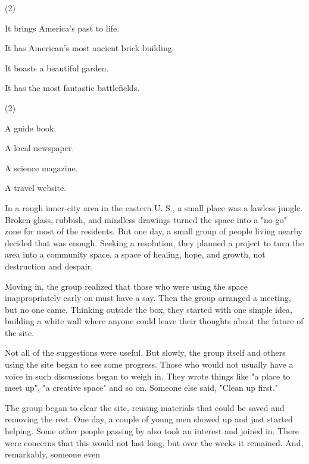 \documentclass{英语试卷}
\begin{document}
\begin{choices}(2)
  \item It brings America's past to life.
  \item It has American's most ancient brick building.
  \item It boasts a beautiful garden.
  \item It has the most fantastic battlefields.
\end{choices}
\begin{choices}(2)
  \item A guide book.
  \item A local newspaper.
  \item A science magazine.
  \item A travel website.
\end{choices}
\par In a rough inner-city area in the eastern U. S., a small place was a lawless jungle. Broken glass, rubbish, and mindless drawings turned the space into a "no-go" zone for most of the residents. But one day, a small group of people living nearby decided that was enough. Seeking a resolution, they planned a project to turn the area into a community space, a space of healing, hope, and growth, not destruction and despair.\par
\par Moving in, the group realized that those who were using the space inappropriately early on must have a say. Then the group arranged a meeting, but no one came. Thinking outside the box, they started with one simple idea, building a white wall where anyone could leave their thoughts about the future of the site.\par
\par Not all of the suggestions were useful. But slowly, the group itself and others using the site began to see some progress. Those who would not usually have a voice in such discussions began to weigh in. They wrote things like "a place to meet up", "a creative space" and so on. Someone else said, "Clean up first."\par
\par The group began to clear the site, reusing materials that could be saved and removing the rest. One day, a couple of young men showed up and just started helping. Some other people passing by also took an interest and joined in. There were concerns that this would not last long, but over the weeks it remained. And, remarkably, someone even\par
\end{document}
